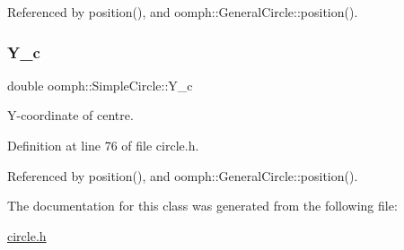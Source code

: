 Referenced by position(), and oomph\+::\+General\+Circle\+::position().

\mbox{\label{classoomph_1_1SimpleCircle_a3f72f452d54ff683b72a15178dd5daae}} 
\subsubsection{\texorpdfstring{Y\+\_\+c}{Y\_c}}
{\footnotesize\ttfamily double oomph\+::\+Simple\+Circle\+::\+Y\+\_\+c\hspace{0.3cm}{\ttfamily [protected]}}



Y-\/coordinate of centre. 



Definition at line 76 of file circle.\+h.



Referenced by position(), and oomph\+::\+General\+Circle\+::position().



The documentation for this class was generated from the following file\+:\begin{DoxyCompactItemize}
\item 
\hyperlink{circle_8h}{circle.\+h}\end{DoxyCompactItemize}
